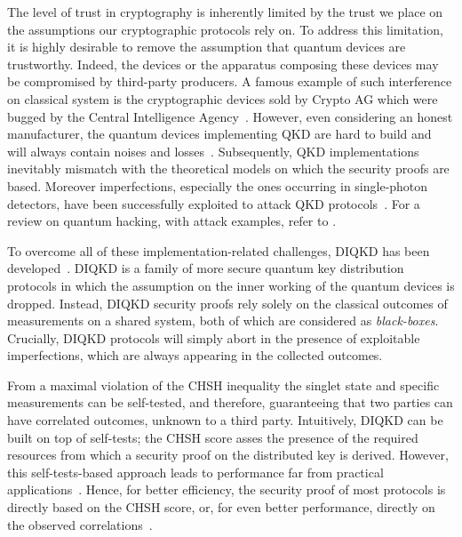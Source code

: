 \medbreak

The level of trust in cryptography is inherently limited by the trust we place on the assumptions our cryptographic protocols rely on. 
To address this limitation, it is highly desirable to remove the assumption that quantum devices are trustworthy.
Indeed, the devices or the apparatus composing these devices may be compromised by third-party producers.
A famous example of such interference on classical system is the cryptographic devices sold by Crypto AG which were bugged by the Central Intelligence Agency~\cite{Miller2020}.
However, even considering an honest manufacturer, the quantum devices implementing QKD are hard to build and will always contain noises and losses~\cite{Diamanti2016,Xu2020}.
Subsequently, QKD implementations inevitably mismatch with the theoretical models on which the security proofs are based. 
Moreover imperfections, especially the ones occurring in single-photon detectors, have been successfully exploited to attack QKD protocols~\cite{Fung2007,Lydersen2010,Gerhardt2011,Weier2011}. 
For a review on quantum hacking, with attack examples, refer to \cite{Lo2014}.

\medbreak

To overcome all of these implementation-related challenges, \acrfull{DIQKD} has been developed~\cite{Acin2007,Vazirani2014,ArnonFriedman2018}.
\acrshort{DIQKD} is a family of more secure quantum key distribution protocols in which the assumption on the inner working of the quantum devices is dropped.
Instead, DIQKD security proofs rely solely on the classical outcomes of measurements on a shared system, both of which are considered as \textit{black-boxes}.
Crucially, DIQKD protocols will simply abort in the presence of exploitable imperfections, which are always appearing in the collected outcomes.

\medbreak

From a maximal violation of the CHSH inequality the singlet state and specific measurements can be self-tested, and therefore, guaranteeing that two parties can have correlated outcomes, unknown to a third party.
Intuitively, DIQKD can be built on top of self-tests; the CHSH score asses the presence of the required resources from which a security proof on the distributed key is derived.
However, this self-tests-based approach leads to performance far from practical applications~\cite{Fu2018,Kundu2022}.
Hence, for better efficiency, the security proof of most protocols is directly based on the CHSH score, or, for even better performance, directly on the observed correlations~\cite{Pironio2009,Ho2020,Sekatski2021,Woodhead2021,Brown2021}.
